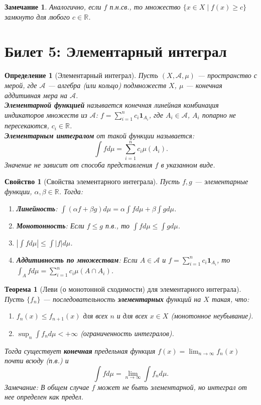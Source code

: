 \documentclass[a4paper, 12pt]{article}
\newtheorem{definition}{Определение}
\newtheorem{theorem}{Теорема}
\newtheorem{property}{Свойство}
\newtheorem{remark}{Замечание}
\newcommand{\R}{\mathbb{R}}
\newcommand{\1}{\mathbf{1}}
\begin{document}
\begin{remark}
    Аналогично, если $f$ п.н.св., то множество $\{x \in X \mid f(x) \geq c\}$ замкнуто для любого $c \in \R$.
\end{remark}

\section*{Билет 5: Элементарный интеграл}
\begin{definition}[Элементарный интеграл]
    Пусть $(X, \mathcal{A}, \mu)$ — пространство с мерой, где $\mathcal{A}$ — алгебра (или кольцо) подмножеств $X$, $\mu$ — конечная аддитивная мера на $\mathcal{A}$. \\
    \textbf{Элементарной функцией} называется конечная линейная комбинация индикаторов множеств из $\mathcal{A}$: $f = \sum_{i=1}^n c_i \1_{A_i}$, где $A_i \in \mathcal{A}$, $A_i$ попарно не пересекаются, $c_i \in \R$. \\
    \textbf{Элементарным интегралом} от такой функции называется:
    \[
    \int f  d\mu = \sum_{i=1}^n c_i \mu(A_i).
    \]
    Значение не зависит от способа представления $f$ в указанном виде.
\end{definition}

\begin{property}[Свойства элементарного интеграла]
    Пусть $f, g$ — элементарные функции, $\alpha, \beta \in \R$. Тогда:
    \begin{enumerate}[label=(\arabic*)]
        \item \textbf{Линейность}: $\int (\alpha f + \beta g)  d\mu = \alpha \int f  d\mu + \beta \int g  d\mu$.
        \item \textbf{Монотонность}: Если $f \leq g$ п.в., то $\int f  d\mu \leq \int g  d\mu$.
        \item $|\int f  d\mu| \leq \int |f|  d\mu$.
        \item \textbf{Аддитивность по множествам}: Если $A \in \mathcal{A}$ и $f = \sum_{i=1}^n c_i \1_{A_i}$, то $\int_A f  d\mu = \sum_{i=1}^n c_i \mu(A \cap A_i)$.
    \end{enumerate}
\end{property}

\begin{theorem}[Леви (о монотонной сходимости) для элементарного интеграла]
    Пусть $\{f_n\}$ — последовательность \textbf{элементарных} функций на $X$ такая, что:
    \begin{enumerate}[label=(\roman*)]
        \item $f_n(x) \leq f_{n+1}(x)$ для всех $n$ и для всех $x \in X$ (монотонное неубывание).
        \item $\sup_n \int f_n  d\mu < +\infty$ (ограниченность интегралов).
    \end{enumerate}
    Тогда существует \textbf{конечная} предельная функция $f(x) = \lim_{n \to \infty} f_n(x)$ почти всюду (п.в.) и
    \[
    \int f  d\mu = \lim_{n \to \infty} \int f_n  d\mu.
    \]
    \textit{Замечание:} В общем случае $f$ может не быть элементарной, но интеграл от нее определен как предел.
\end{theorem}
\end{document}
